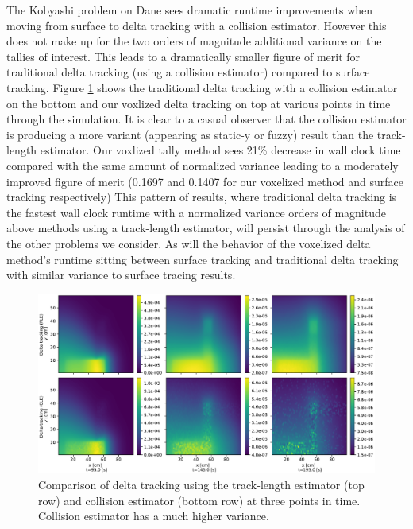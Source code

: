 The Kobyashi problem on Dane sees dramatic runtime improvements when moving from surface to delta tracking with a collision estimator.
However this does not make up for the two orders of magnitude additional variance on the tallies of interest.
This leads to a dramatically smaller figure of merit for traditional delta tracking (using a collision estimator) compared to surface tracking.
Figure \ref{fig:koby} shows the traditional delta tracking with a collision estimator on the bottom and our voxlized delta tracking on top at various points in time through the simulation.
It is clear to a casual observer that the collision estimator is producing a more variant (appearing as static-y or fuzzy) result than the track-length estimator.
Our voxlized tally method sees 21\% decrease in wall clock time compared with the same amount of normalized variance leading to a moderately improved figure of merit (\num{0.1697} and \num{0.1407} for our voxelized method and surface tracking respectively) 
This pattern of results, where traditional delta tracking is the fastest wall clock runtime with a normalized variance orders of magnitude above methods using a track-length estimator, will persist through the analysis of the other problems we consider.
As will the behavior of the voxelized delta method's runtime sitting between surface tracking and traditional delta tracking with similar variance to surface tracing results.


\begin{figure}
    \centering
    \includegraphics[width=\textwidth]{figures/delta_figs/cle_v_tle.pdf}
    \caption{Comparison of delta tracking using the track-length estimator (top row) and collision estimator (bottom row) at three points in time. Collision estimator has a much higher variance.}
    \label{fig:koby}
\end{figure}

